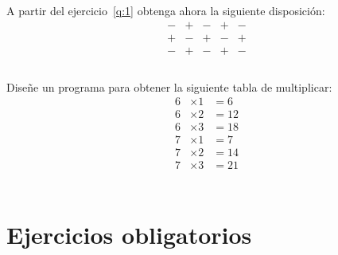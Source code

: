\documentclass[spanish,addpoints,answers,a4paper]{exam}
\begin{document}
\begin{questions}
\question A partir del ejercicio~\ref{q:1} obtenga ahora la siguiente disposición:
\begin{equation*}
	\begin{matrix}
	- & + & - & + & - \\
	+ & - & + & - & + \\
	- & + & - & + & -
	\end{matrix}
\end{equation*}

\begin{solution}
	\begin{listing}[H]
		\footnotesize
		\inputminted{cpp}{4_b.cc}
		\caption{Programa \texttt{4\textunderscore b.cc}.}
		\label{lst:3.4b}
	\end{listing}
\end{solution}

\question Diseñe un programa para obtener la siguiente tabla de multiplicar:
\begin{align*}
6 &\times 1 &= 6 \\
6 &\times 2 &= 12 \\
6 &\times 3 &= 18 \\
7 &\times 1 &= 7 \\
7 &\times 2 &= 14 \\
7 &\times 3 &= 21 \\
\end{align*}

\begin{solution}
	\begin{listing}[H]
		\footnotesize
		\inputminted{cpp}{5_b.cc}
		\caption{Programa \texttt{5\textunderscore b.cc}.}
		\label{lst:3.5b}
	\end{listing}
\end{solution}

\end{questions}

\section*{Ejercicios obligatorios}
\end{document}
